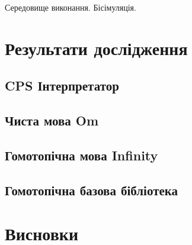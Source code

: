 \documentclass{article}
\begin{document}
Середовище виконання.
Бісімуляція.

\section{Результати дослідження}

\subsection{CPS Інтерпретатор}

\subsection{Чиста мова Om}

\subsection{Гомотопічна мова Infinity}

\subsection{Гомотопічна базова бібліотека}

\section{Висновки}

\cite{Lof72}
\cite{Lof84}
\cite{Coq88}
\cite{Hofmann96}
\cite{Henk93}
\cite{Erik97}
\cite{Hermida95}
\cite{Curien08}
\cite{MacLane71}
\cite{Lawvere09}
\cite{Dybjer95}
\cite{Dybjer08}
\cite{Clairambault05}
\cite{Abel08}
\cite{Seely84}
\cite{Curien14}
\cite{Castellan14}
\cite{Voevodsky14}
\cite{Bishop67}
\cite{Nordstrom90}
\cite{Hermida98}
\cite{Barthe00}
\cite{Voevodsky15}
\cite{Sozeau}
\cite{Selsam16}
\cite{Bohm85}
\cite{Pfenning89}
\cite{Wadler90}
\cite{Gambino03}
\cite{Dybjer94}
\cite{Jacobs97}
\cite{Vene00}
\cite{Basold16}
\cite{Hofmann94}
\cite{Jacobs99}
\cite{Joyal14}
\cite{HoTT13}
\cite{Mortberg17}
\cite{Shulman15}
\cite{Orton17}
\cite{Huber16}
\cite{Huber17}
\cite{Angiuli16}
\cite{Angiuli16}


% 

\end{document}
